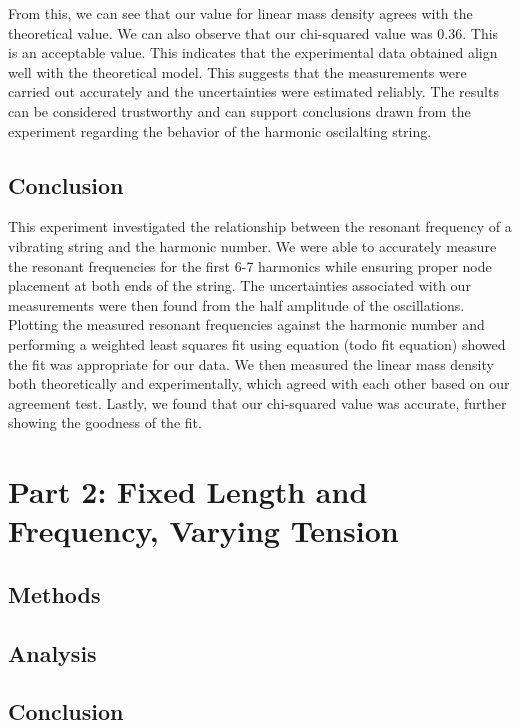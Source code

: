 \documentclass[11pt]{article}
\let\oldsection\section
\renewcommand\section{\clearpage\oldsection}
\begin{document}
    From this, we can see that our value for linear mass density agrees with the theoretical value. We can also observe that our chi-squared value was 0.36. This is an acceptable value. This indicates that the experimental data obtained align well with the theoretical model. This suggests that the measurements were carried out accurately and the uncertainties were estimated reliably. The results can be considered trustworthy and can support conclusions drawn from the experiment regarding the behavior of the harmonic oscilalting string. 



    \subsection{Conclusion}\label{subsec:part_1_conclusion}
    This experiment investigated the relationship between the resonant frequency of a vibrating string and the harmonic number. We were able to accurately measure the resonant frequencies for the first 6-7 harmonics while ensuring proper node placement at both ends of the string. The uncertainties associated with our measurements were then found from the half amplitude of the oscillations. Plotting the measured resonant frequencies against the harmonic number and performing a weighted least squares fit using equation (todo fit equation) showed the fit was appropriate for our data. We then measured the linear mass density both theoretically and experimentally, which agreed with each other based on our agreement test. Lastly, we found that our chi-squared value was accurate, further showing the goodness of the fit.

    \section{Part 2: Fixed Length and Frequency, Varying Tension }\label{sec:part_2}
    \subsection{Methods}\label{subsec:part_2_methods}
    \subsection{Analysis}\label{subsec:part_2_analysis}
    \subsection{Conclusion}\label{subsec:part_2_conclusion}
\end{document}
